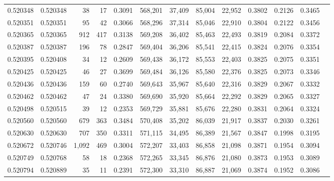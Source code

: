 \begin{tabular}{rrrrrrrrrrrrr}
0.520348 & 0.520348 &    38 &    17 &                                     0.3091 & 568,201 &  37,409 &  85,004 &  22,952 & 0.3802 & 0.2126 & 0.3465 \\
0.520351 & 0.520351 &    95 &    42 &                                     0.3066 & 568,296 &  37,314 &  85,046 &  22,910 & 0.3804 & 0.2122 & 0.3456 \\
0.520365 & 0.520365 &   912 &   417 &                                     0.3138 & 569,208 &  36,402 &  85,463 &  22,493 & 0.3819 & 0.2084 & 0.3372 \\
0.520387 & 0.520387 &   196 &    78 &                                     0.2847 & 569,404 &  36,206 &  85,541 &  22,415 & 0.3824 & 0.2076 & 0.3354 \\
0.520395 & 0.520408 &    34 &    12 &                                     0.2609 & 569,438 &  36,172 &  85,553 &  22,403 & 0.3825 & 0.2075 & 0.3351 \\
0.520425 & 0.520425 &    46 &    27 &                                     0.3699 & 569,484 &  36,126 &  85,580 &  22,376 & 0.3825 & 0.2073 & 0.3346 \\
0.520436 & 0.520436 &   159 &    60 &                                     0.2740 & 569,643 &  35,967 &  85,640 &  22,316 & 0.3829 & 0.2067 & 0.3332 \\
0.520462 & 0.520462 &    47 &    24 &                                     0.3380 & 569,690 &  35,920 &  85,664 &  22,292 & 0.3829 & 0.2065 & 0.3327 \\
0.520498 & 0.520515 &    39 &    12 &                                     0.2353 & 569,729 &  35,881 &  85,676 &  22,280 & 0.3831 & 0.2064 & 0.3324 \\
0.520560 & 0.520560 &   679 &   363 &                                     0.3484 & 570,408 &  35,202 &  86,039 &  21,917 & 0.3837 & 0.2030 & 0.3261 \\
0.520630 & 0.520630 &   707 &   350 &                                     0.3311 & 571,115 &  34,495 &  86,389 &  21,567 & 0.3847 & 0.1998 & 0.3195 \\
0.520672 & 0.520746 & 1,092 &   469 &                                     0.3004 & 572,207 &  33,403 &  86,858 &  21,098 & 0.3871 & 0.1954 & 0.3094 \\
0.520749 & 0.520768 &    58 &    18 &                                     0.2368 & 572,265 &  33,345 &  86,876 &  21,080 & 0.3873 & 0.1953 & 0.3089 \\
0.520794 & 0.520889 &    35 &    11 &                                     0.2391 & 572,300 &  33,310 &  86,887 &  21,069 & 0.3874 & 0.1952 & 0.3086 \\

\end{tabular}
